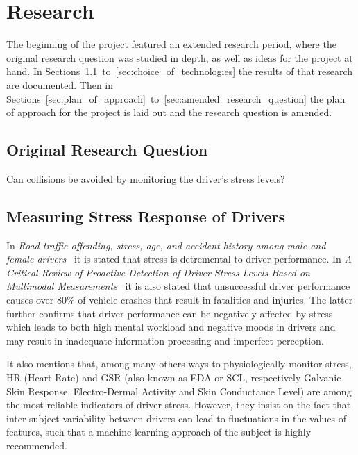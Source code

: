 \section{Research}\label{sec:research}

The beginning of the project featured an extended research
period, where the original research question was studied
in depth, as well as ideas for the project at hand. In
Sections~\ref{sec:research_question}~to~\ref{sec:choice_of_technologies}
the results of that research are documented. Then in
Sections~\ref{sec:plan_of_approach}~to~\ref{sec:amended_research_question}
the plan of approach for the project is laid out and the research question
is amended.

\subsection{Original Research Question}\label{sec:research_question}

Can collisions be avoided by monitoring the driver's stress levels?

\subsection{Measuring Stress Response of
Drivers}\label{sec:research_stress}

In \textit{Road traffic offending, stress, age, and accident history among male
and female drivers}~\cite{road_traffic} it is stated that stress is detremental
to driver performance. In \textit{A Critical Review of Proactive Detection of
Driver Stress Levels Based on Multimodal Measurements}~\cite{critical_review}
it is
also stated that unsuccessful driver performance causes over 80\% of vehicle
crashes that result in fatalities and injuries. The latter further confirms
that driver performance can be negatively affected by stress which leads to
both high mental workload and negative moods in drivers and may result in
inadequate information processing and imperfect perception.

It also mentions that, among many others ways to physiologically monitor
stress, HR (Heart Rate) and GSR (also known as EDA or SCL, respectively
Galvanic Skin Response, Electro-Dermal Activity and Skin Conductance Level)
are among the most reliable indicators of driver stress. However, they
insist on the fact that inter-subject variability between drivers can lead
to fluctuations in the values of features, such that a machine learning
approach of the subject is highly recommended.

